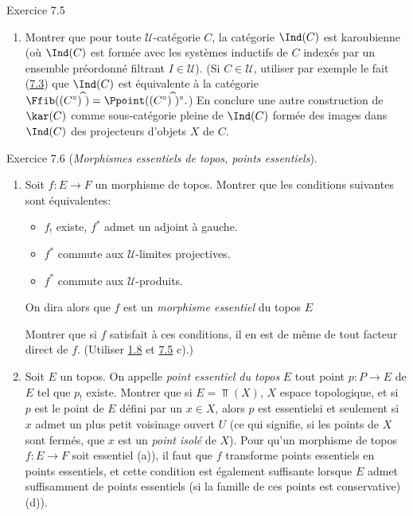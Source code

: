 \documentclass[10pt]{../fichiers-configuration-latex/smfart}
\begin{document}
\begin{enonce*}[remark]{Exercice 7.5}
\begin{enumerate}
\item Montrer que pour toute $𝒰$-catégorie $C$, la catégorie
$\Ind(C)$ est karoubienne (où $\Ind(C)$ est formée avec les systèmes
inductifs de $C$ indexés par un ensemble préordonné filtrant $I\in
𝒰$). (Si $C\in 𝒰$, utiliser par exemple le fait
(\hyperref[IV.subsec7.3]{7.3}) que $\Ind(C)$ est équivalente à la catégorie
$\Ffib((C^{\circ})^{\widehat{\phantom{,}}})=\Ppoint((C^{\circ})^{\widehat{\phantom{,}}})^{\circ}.$)
En conclure une autre construction de $\kar(C)$ comme sous-catégorie
pleine de $\Ind(C)$ formée des images dans $\Ind(C)$ des projecteurs
d'objets $X$ de $C$.
\end{enumerate}
\end{enonce*}

\begin{enonce*}[remark]{Exercice 7.6}
(\emph{Morphismes essentiels de topos, points essentiels}).
\begin{enumerate}
\renewcommand{\theenumi}{\alph{enumi}}
\renewcommand{\labelenumi}{\theenumi)}
\item Soit $f:E\rightarrow F$ un morphisme de topos. Montrer que les
conditions suivantes sont équivalentes:
\begin{itemize}
\item[i)] $f_{!}$ existe, \ie $f^{\ast}$ admet un adjoint à gauche.

\item[ii)] $f^{\ast}$ commute aux $𝒰$-limites projectives.

\item[${\rm ii')}$] $f^{\ast}$ commute aux $𝒰$-produits.
\end{itemize}
On dira alors que $f$ est un \emph{morphisme essentiel} du topos $E$

Montrer que si $f$ satisfait à ces conditions, il en est de même de
tout facteur direct de $f$. (Utiliser \hyperref[IV.rem1.8]{1.8} et
\hyperref[IV.exer7.5]{7.5} c).)

\item Soit $E$ un topos. On appelle \emph{point essentiel du topos}
$E$ tout point $p:P\rightarrow E$ de $E$ tel que $p_{!}$ existe.
Montrer que si $E=\Top(X)$, $X$ espace topologique, et si $p$ est le
point de $E$ défini par un $x\in X$, alors $p$ est
essentiel\pageoriginale si et seulement si $x$ admet un plus petit
voisinage ouvert $U$ (ce qui signifie, si les points de $X$ sont
fermés, que $x$ est un \emph{point isolé} de $X$). Pour qu'un
morphisme de topos $f:E\rightarrow F$ soit essentiel (a)), il faut
que $f$ transforme points essentiels en points essentiels, et cette
condition est également suffisante lorsque $E$ admet suffisamment de
points essentiels (\ie si la famille de ces points est conservative)
(\cf d)).


\end{enumerate}
\end{enonce*}
\end{document}
